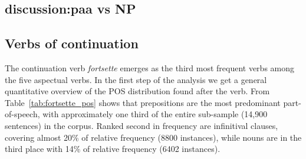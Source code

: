 \documentclass{article}
\begin{document}
\subsection{discussion:paa vs NP}




 



\subsection{Verbs of continuation}


The continuation verb \emph{fortsette} emerges as the third most frequent verbs among the five aspectual verbs. In the first step of the analysis we get a general quantitative overview of the POS distribution found after the verb. From Table~\ref{tab:fortsette_pos} shows that prepositions are the most predominant part-of-speech, with approximately one third of the entire sub-sample (14,900 sentences) in the corpus. Ranked second in frequency are infinitival clauses, covering almost 20\% of relative frequency (8800 instances), while nouns are in the third place with 14\% of relative frequency (6402 instances). 
\end{document}
